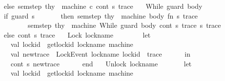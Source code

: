 \begin{isabellebody}
\ \ \ \ \ \ else\ sem{\isacharunderscore}{\kern0pt}step\ thy\ \ machine\ c{}\ cont\ {\isacharparenleft}{\kern0pt}s{\isacharcomma}{\kern0pt}\ trace{\isacharparenright}{\kern0pt}\isanewline
\ \ {\isacharbar}{\kern0pt}\ While\ {\isacharparenleft}{\kern0pt}guard{\isacharcomma}{\kern0pt}\ body{\isacharparenright}{\kern0pt}\ {\isacharequal}{\kern0pt}{\isachargreater}{\kern0pt}\isanewline
\ \ \ \ \ \ if\ guard\ s\ \isanewline
\ \ \ \ \ \ then\ sem{\isacharunderscore}{\kern0pt}step\ thy\ \ machine\ body\ {\isacharparenleft}{\kern0pt}fn\ {\isacharparenleft}{\kern0pt}s{\isacharprime}{\kern0pt}{\isacharcomma}{\kern0pt}\ trace{\isacharprime}{\kern0pt}{\isacharparenright}{\kern0pt}\ {\isacharequal}{\kern0pt}{\isachargreater}{\kern0pt}\ \isanewline
\ \ \ \ \ \ \ \ \ \ \ \ \ sem{\isacharunderscore}{\kern0pt}step\ thy\ \ machine\ {\isacharparenleft}{\kern0pt}While\ {\isacharparenleft}{\kern0pt}guard{\isacharcomma}{\kern0pt}\ body{\isacharparenright}{\kern0pt}{\isacharparenright}{\kern0pt}\ cont\ {\isacharparenleft}{\kern0pt}s{\isacharprime}{\kern0pt}{\isacharcomma}{\kern0pt}\ trace{\isacharprime}{\kern0pt}{\isacharparenright}{\kern0pt}{\isacharparenright}{\kern0pt}\ {\isacharparenleft}{\kern0pt}s{\isacharcomma}{\kern0pt}\ trace{\isacharparenright}{\kern0pt}\isanewline
\ \ \ \ \ \ else\ cont\ {\isacharparenleft}{\kern0pt}s{\isacharcomma}{\kern0pt}\ trace{\isacharparenright}{\kern0pt}\isanewline
\ \ {\isacharbar}{\kern0pt}\ Lock\ lock{\isacharunderscore}{\kern0pt}name\ {\isacharequal}{\kern0pt}{\isachargreater}{\kern0pt}\ \isanewline
\ \ \ \ \ \ let\isanewline
\ \ \ \ \ \ \ \ val\ lock{\isacharunderscore}{\kern0pt}id\ {\isacharequal}{\kern0pt}\ get{\isacharunderscore}{\kern0pt}lock{\isacharunderscore}{\kern0pt}id\ lock{\isacharunderscore}{\kern0pt}name\ machine\isanewline
\ \ \ \ \ \ \ \ val\ new{\isacharunderscore}{\kern0pt}trace\ {\isacharequal}{\kern0pt}\ LockEvent\ {\isacharparenleft}{\kern0pt}lock{\isacharunderscore}{\kern0pt}name{\isacharcomma}{\kern0pt}\ lock{\isacharunderscore}{\kern0pt}id{\isacharparenright}{\kern0pt}\ {\isacharcolon}{\kern0pt}{\isacharcolon}{\kern0pt}\ trace\isanewline
\ \ \ \ \ \ in\isanewline
\ \ \ \ \ \ \ \ cont\ {\isacharparenleft}{\kern0pt}s{\isacharcomma}{\kern0pt}\ new{\isacharunderscore}{\kern0pt}trace{\isacharparenright}{\kern0pt}\isanewline
\ \ \ \ \ \ end\isanewline
\ \ {\isacharbar}{\kern0pt}\ Unlock\ lock{\isacharunderscore}{\kern0pt}name\ {\isacharequal}{\kern0pt}{\isachargreater}{\kern0pt}\isanewline
\ \ \ \ \ \ let\isanewline
\ \ \ \ \ \ \ \ val\ lock{\isacharunderscore}{\kern0pt}id\ {\isacharequal}{\kern0pt}\ get{\isacharunderscore}{\kern0pt}lock{\isacharunderscore}{\kern0pt}id\ lock{\isacharunderscore}{\kern0pt}name\ machine\isanewline

\end{isabellebody}
